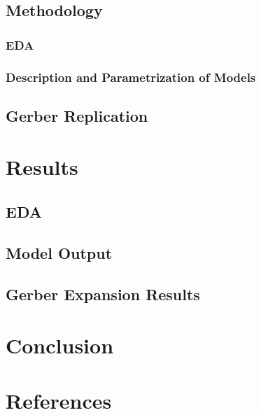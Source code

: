 \documentclass[12pt,twoside]{reedthesis}
\begin{document}
  \section{Methodology}\label{methodology}
  
  \subsection{EDA}\label{eda}
  
  \subsection{Description and Parametrization of
  Models}\label{description-and-parametrization-of-models}
  
  \section{Gerber Replication}\label{gerber-replication}
  
  \chapter{Results}\label{results}
  
  \section{EDA}\label{eda-1}
  
  \section{Model Output}\label{model-output}
  
  \section{Gerber Expansion Results}\label{gerber-expansion-results}
  
  \chapter*{Conclusion}\label{conclusion}
  
  \setcounter{chapter}{4} \setcounter{section}{0}
  
  \appendix
  
  \backmatter
  
  \chapter{References}\label{references}
  
  \noindent
  
  \setlength{\parindent}{-0.20in} \setlength{\leftskip}{0.20in}
  \setlength{\parskip}{8pt}


\end{document}
